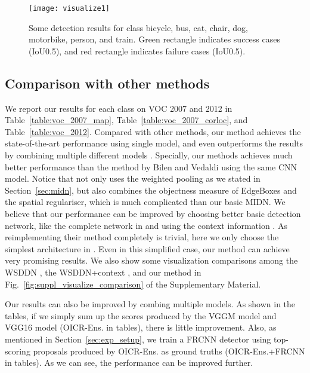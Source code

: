 \documentclass[10pt,twocolumn,letterpaper]{article}
\def\methodname{OICR}
\begin{document}
\begin{figure*}[!t]
\begin{center}
   \texttt{[image: visualize1]}
\end{center}
   \caption{Some detection results for class bicycle, bus, cat, chair, dog, motorbike, person, and train.
   Green rectangle indicates success cases (IoU0.5), and red rectangle indicates failure cases (IoU0.5).}
\label{fig:visualize1}
\end{figure*}



\subsection{Comparison with other methods}
\label{sec:compar}

We report our results for each class on VOC 2007 and 2012 in Table~\ref{table:voc_2007_map}, Table~\ref{table:voc_2007_corloc}, and Table~\ref{table:voc_2012}.
Compared with other methods, our method achieves the state-of-the-art performance using single model, and even outperforms the results by combining multiple different models \cite{Ref:Bilen2016,Ref:Li2016}.
Specially, our methods achieves much better performance than the method by Bilen and Vedaldi \cite{Ref:Bilen2016} using the same CNN model.
Notice that \cite{Ref:Bilen2016} not only uses the weighted pooling as we stated in Section~\ref{sec:midn}, but also combines the objectness measure of EdgeBoxes \cite{Ref:Zitnick2014} and the spatial regulariser, which is much complicated than our basic MIDN.
We believe that our performance can be improved by choosing better basic detection network, like the complete network in \cite{Ref:Bilen2016} and using the context information \cite{Ref:Kantorov2016}.
As reimplementing their method completely is trivial, here we only choose the simplest architecture in \cite{Ref:Bilen2016}.
Even in this simplified case, our method can achieve very promising results.
We also show some visualization comparisons among the WSDDN \cite{Ref:Bilen2016}, the WSDDN+context \cite{Ref:Kantorov2016}, and our method in Fig.~\ref{fig:suppl_visualize_comparison} of the Supplementary Material.

Our results can also be improved by combing multiple models.
As shown in the tables, if we simply sum up the scores produced by the VGGM model and VGG16 model (\methodname-Ens. in tables), there is little improvement.
Also, as mentioned in Section~\ref{sec:exp_setup}, we train a FRCNN detector using top-scoring proposals produced by \methodname-Ens. as ground truths (\methodname-Ens.+FRCNN in tables).
As we can see, the performance can be improved further.
\end{document}
